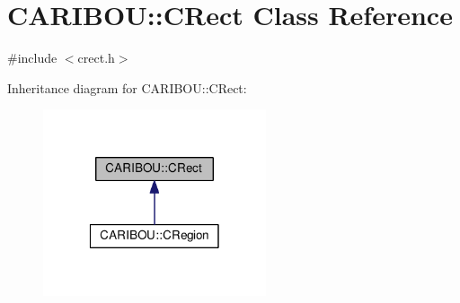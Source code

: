 \section{C\-A\-R\-I\-B\-O\-U\-:\-:C\-Rect Class Reference}
\label{class_c_a_r_i_b_o_u_1_1_c_rect}


{\ttfamily \#include $<$crect.\-h$>$}



Inheritance diagram for C\-A\-R\-I\-B\-O\-U\-:\-:C\-Rect\-:\nopagebreak
\begin{figure}[H]
\begin{center}
\leavevmode
\includegraphics[width=186pt]{class_c_a_r_i_b_o_u_1_1_c_rect__inherit__graph}
\end{center}
\end{figure}
